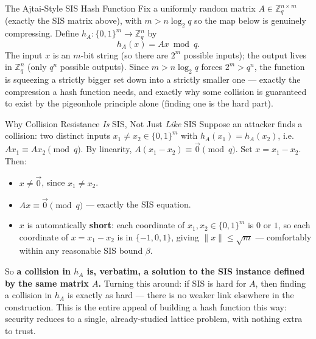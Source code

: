 \begin{defbox}{The Ajtai-Style SIS Hash Function}
Fix a uniformly random matrix $A \in \mathbb{Z}_q^{n \times m}$ (exactly the SIS matrix above), with $m > n\log_2 q$ so the map below is genuinely compressing. Define $h_A : \{0,1\}^m \to \mathbb{Z}_q^n$ by
$$
h_A(x) = Ax \bmod q.
$$
The input $x$ is an $m$-bit string (so there are $2^m$ possible inputs); the output lives in $\mathbb{Z}_q^n$ (only $q^n$ possible outputs). Since $m > n \log_2 q$ forces $2^m > q^n$, the function is squeezing a strictly bigger set down into a strictly smaller one --- exactly the compression a hash function needs, and exactly why some collision is guaranteed to exist by the pigeonhole principle alone (finding one is the hard part).
\end{defbox}

\begin{rmkbox}{Why Collision Resistance \emph{Is} SIS, Not Just \emph{Like} SIS}
Suppose an attacker finds a collision: two distinct inputs $x_1 \ne x_2 \in \{0,1\}^m$ with $h_A(x_1) = h_A(x_2)$, i.e.\ $Ax_1 \equiv Ax_2 \pmod q$. By linearity, $A(x_1 - x_2) \equiv \vec 0 \pmod q$. Set $x = x_1 - x_2$. Then:
\begin{itemize}[leftmargin=*]
  \item $x \ne \vec 0$, since $x_1 \ne x_2$.
  \item $A x \equiv \vec 0 \pmod q$ --- exactly the SIS equation.
  \item $x$ is automatically \textbf{short}: each coordinate of $x_1, x_2 \in \{0,1\}^m$ is $0$ or $1$, so each coordinate of $x = x_1-x_2$ is in $\{-1,0,1\}$, giving $\|x\| \le \sqrt{m}$ --- comfortably within any reasonable SIS bound $\beta$.
\end{itemize}
So \textbf{a collision in $h_A$ is, verbatim, a solution to the SIS instance defined by the same matrix $A$.} Turning this around: if SIS is hard for $A$, then finding a collision in $h_A$ is exactly as hard --- there is no weaker link elsewhere in the construction. This is the entire appeal of building a hash function this way: security reduces to a single, already-studied lattice problem, with nothing extra to trust.
\end{rmkbox}

